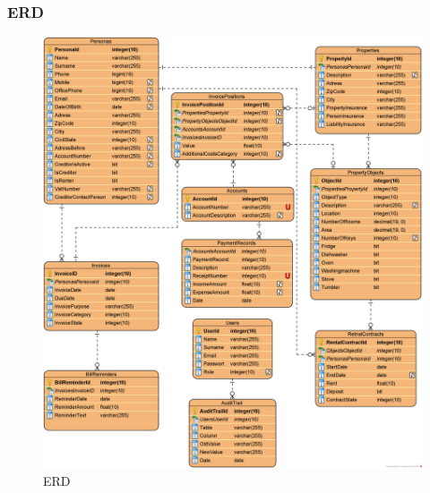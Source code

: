 \subsubsection{ERD}
\begin{figure}[H]
  \begin{center}
    \includegraphics[height=1.15\textwidth]{content/diagrams/out/erd/erd.png}
    \caption{ERD}
    \label{ERD}
  \end{center}
\end{figure}


